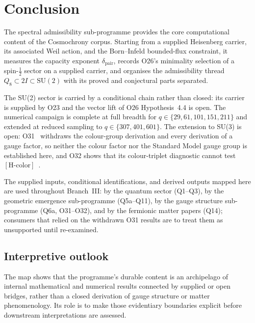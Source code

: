 \documentclass[11pt,a4paper]{article}
\theoremstyle{definition}
\newcommand{\SU}{\mathrm{SU}}
\newcommand{\dimpair}{\delta_{\mathrm{pair}}}
\begin{document}
  \section{Conclusion}
    \label{sec:conclusion}

    The spectral admissibility sub-programme provides the core computational content of the
    Cosmochrony corpus.
    Starting from a supplied Heisenberg carrier, its associated Weil action, and the Born--Infeld
    bounded-flux constraint, it measures the capacity exponent $\dimpair$, records O26's minimality
    selection of a spin-$\tfrac{1}{2}$ sector on a supplied carrier, and organises the admissibility
    thread $Q_8 \subset 2I \subset \SU(2)$ with its proved and conjectural parts separated.

    The SU(2) sector is carried by a conditional chain rather than closed: its carrier is supplied
    by O23 and the vector lift of O26 Hypothesis~4.4 is open.
    The numerical campaign is complete at full breadth for $q \in \{29, 61, 101, 151, 211\}$ and
    extended at reduced sampling to $q \in \{307, 401, 601\}$.
    The extension to SU(3) is open: O31~\cite{Beau2026a35} withdraws the colour-group derivation
    and every derivation of a gauge factor, so neither the colour factor nor the Standard Model
    gauge group is established here, and O32 shows that its colour-triplet diagnostic cannot test
    $[\mathrm{H\text{-}color}]$~\cite{Beau2026a36}.

    The supplied inputs, conditional identifications, and derived outputs mapped here are used
    throughout Branch~III: by the quantum sector
    (Q1--Q3), by the geometric emergence sub-programme (Q5a--Q11), by the gauge structure
    sub-programme (Q6a, O31--O32), and by the fermionic matter papers (Q14); consumers that
    relied on the withdrawn O31 results are to treat them as unsupported until re-examined.
    \subsection*{Interpretive outlook}
    The map shows that the programme's durable content is an archipelago of internal mathematical
    and numerical results connected by supplied or open bridges, rather than a closed derivation of
    gauge structure or matter phenomenology.
    Its role is to make those evidentiary boundaries explicit before downstream interpretations are
    assessed.

    \newpage
    
    
\end{document}
